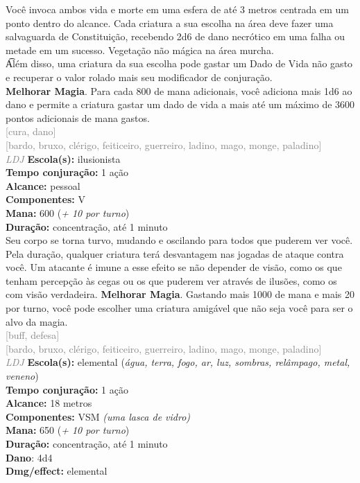 \documentclass{RPG_Adventure}[2021/10/20]
\begin{document}
{\normalsize Você invoca ambos vida e morte em uma esfera de até 3 metros centrada em um ponto dentro do alcance. Cada criatura a sua escolha na área deve fazer uma salvaguarda de Constituição, recebendo 2d6 de dano necrótico em uma falha ou metade em um sucesso. Vegetação não mágica na área murcha.\\\t Além disso, uma criatura da sua escolha pode gastar um Dado de Vida não gasto e recuperar o valor rolado mais seu modificador de conjuração.\\\t \textbf{Melhorar Magia}. Para cada 800 de mana adicionais, você adiciona mais 1d6 ao dano e permite a criatura gastar um dado de vida a mais até um máximo de 3600 pontos adicionais de mana gastos.\\}
{\scriptsize \textcolor{gray}{[cura, dano]\\}}
{\scriptsize \textcolor{gray}{[bardo, bruxo, clérigo, feiticeiro, guerreiro, ladino, mago, monge, paladino]\\}}
{\tiny \textcolor{gray}{\textit{LDJ}}}
{\small \t \textbf{Escola(s):} ilusionista\\\t \textbf{Tempo conjuração:} 1 ação\\\t \textbf{Alcance:} pessoal\\\t \textbf{Componentes:} V\\\t \textbf{Mana:} 600 (\textit{+ 10 por turno})\\\t \textbf{Duração:} concentração, até 1 minuto\\}
{\normalsize Seu corpo se torna turvo, mudando e oscilando para todos que puderem ver você. Pela duração, qualquer criatura terá desvantagem nas jogadas de ataque contra você. Um atacante é imune a esse efeito se não depender de visão, como os que tenham percepção às cegas ou os que puderem ver através de ilusões, como os com visão verdadeira. \textbf{Melhorar Magia}. Gastando mais 1000 de mana e mais 20 por turno, você pode escolher uma criatura amigável que não seja você para ser o alvo da magia.\\}
{\scriptsize \textcolor{gray}{[buff, defesa]\\}}
{\scriptsize \textcolor{gray}{[bardo, bruxo, clérigo, feiticeiro, guerreiro, ladino, mago, monge, paladino]\\}}
{\tiny \textcolor{gray}{\textit{LDJ}}}
{\small \t \textbf{Escola(s):} elemental (\textit{água, terra, fogo, ar, luz, sombras, relâmpago, metal, veneno})\\\t \textbf{Tempo conjuração:} 1 ação\\\t \textbf{Alcance:} 18 metros\\\t \textbf{Componentes:} VSM \textit{(uma lasca de vidro)}\\\t \textbf{Mana:} 650 (\textit{+ 10 por turno})\\\t \textbf{Duração:} concentração, até 1 minuto\\\t \textbf{Dano}: 4d4\\\t \textbf{Dmg/effect:} elemental\\}
\end{document}
